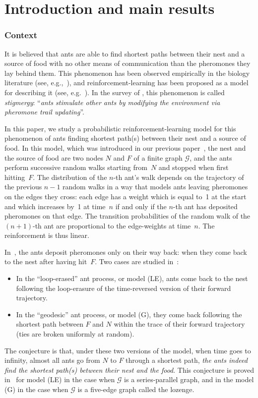 \section{Introduction and main results}
\subsubsection*{Context}
It is believed that ants are able to find shortest paths between their nest and a source of food
with no other means of communication than the pheromones they lay behind them.
This phenomenon has been observed empirically in the biology literature
(see, e.g.,~\cite{ants_89, Deneu90, current_ants}), and reinforcement-learning has been proposed as a model for {describing it} (see, e.g.~\cite{current_ants}).
In the survey of \cite[Ch.\,1]{book_ant}, this phenomenon is called \emph{stigmergy}: ``\emph{ants stimulate other ants by modifying the environment via pheromone trail updating}''.

In this paper, we study a probabilistic reinforcement-learning model
for this phenomenon of ants finding shortest path(s) between their nest and a source of food.
In this model, which was introduced in our previous paper~\cite{KMS},
the nest and the source of food are two nodes $N$ and $F$ of a finite graph $\mathcal G$,
and the ants perform successive random walks starting from~$N$ and stopped when first hitting~$F$.
The distribution of the $n$-th ant's walk depends on the trajectory of the previous $n-1$ random walks in a way that models ants leaving pheromones on the edges they cross:
each edge has a weight which is equal to~{1} at the start and which increases by~1
at time~$n$ if and only if the $n$-th ant has deposited pheromones on that edge.
The transition probabilities of the random walk of the $(n+1)$-th ant are proportional to the edge-weights at time~$n$.
The reinforcement is thus linear.

In~\cite{KMS}, the ants deposit pheromones only on their way back:
\ie when they come back to the nest after having hit~$F$.
Two cases are studied in~\cite{KMS}:
\begin{itemize}
\item In the ``loop-erased'' ant process, or model (LE), ants come back to the nest following the loop-erasure of the time-reversed version of their forward trajectory.
\item In the ``geodesic'' ant process, or model (G), they come back following the shortest path between $F$ and $N$ within the trace of their forward trajectory (ties are broken uniformly at random).
\end{itemize}
The conjecture is that, under these two versions of the model, when time goes to infinity, almost all ants go from $N$ to $F$ through a shortest path, \ie \emph{the ants indeed find the shortest path(s) between their nest and the food}.
This conjecture is proved in~\cite{KMS} for model (LE) in the case when $\mathcal G$ is a series-parallel graph, and in the model (G) in the case when $\mathcal G$ is a five-edge graph called the lozenge.


